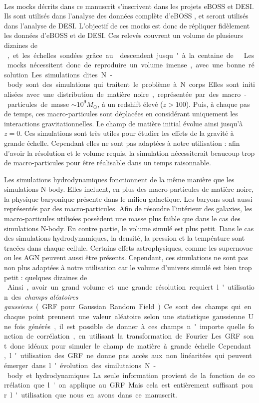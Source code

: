 \documentclass[11pt, twoside, a4paper, openright]{report}
\begin{document}
\paragraph{}
Les mocks décrits dans ce manuscrit s'inscrivent dans les projets eBOSS et DESI. Ils sont utilisés dans l'analyse \lya{} des données complète d'eBOSS \citep{CITE:dr16}, et seront utilisés dans l'analyse \lya{} de DESI.
L'objectif de ces mocks est donc de répliquer fidèlement les données \lya{} d'eBOSS et de DESI. Ces relevés couvrent un volume de plusieurs dizaines de \si{\perh\cubic\Gpc}, et les échelles sondées grâce au \lya{} descendent jusqu'à la centaine de \si{\perh\kpc}. Les mocks nécessitent donc de reproduire un volume imense, avec une bonne résolution.
Les simulations dites N-body sont des simulations qui traitent le problème à N corps. Elles sont initialisées avec une distribution de matière noire, représentée par des macro-particules de masse $\sim 10^{9} M_{\odot}$, à un redshift élevé ($z > 100$). Puis, à chaque pas de temps, ces macro-particules sont déplacées en considérant uniquement les interactions gravitationnelles. Le champ de matière initial évolue ainsi jusqu'à $z=0$. Ces simulations sont très utiles pour étudier les effets de la gravité à grande échelle. Cependant elles ne sont pas adaptées à notre utilisation : afin d'avoir la résolution et le volume requis, la simulation nécessiterait beaucoup trop de macro-particules pour être réalisable dans un temps raisonnable.

Les simulations hydrodynamiques fonctionnent de la même manière que les simulations N-body. Elles incluent, en plus des macro-particules de matière noire, la physique baryonique présente dans le milieu galactique. Les baryons sont aussi représentés par des macro-particules. Afin de résoudre l'intérieur des galaxies, les macro-particules utilisées possèdent une masse plus faible que dans le cas des simulations N-body. En contre partie, le volume simulé est plus petit. Dans le cas des simulations hydrodynamiques, la densité, la pression et la tempéature sont tracées dans chaque cellule. Certains effets astrophysiques, comme les supernovae ou les AGN peuvent aussi être présents. Cependant, ces simulations ne sont pas non plus adaptées à notre utilisation car le volume d'univers simulé est bien trop petit : quelques dizaines de \si{\perh\cubic\Mpc}.
Ainsi, avoir un grand volume et une grande résolution requiert l'utilisation des \emph{champs aléatoires gaussiens} (GRF pour Gaussian Random Field). Ce sont des champs qui en chaque point prennent une valeur aléatoire selon une statistique gaussienne. Une fois générés, il est possible de donner à ces champs n'importe quelle fonction de corrélation, en utilisant la transformation de Fourier. Les GRF sont donc idéaux pour simuler le champ de matière à grande échelle. Cependant, l'utilisation des GRF ne donne pas accès aux non linéaritées qui peuvent émerger dans l'évolution des similutaions N-body et hydrodynamiques. La seule information provient de la fonction de corrélation que l'on applique au GRF. Mais cela est entièrement suffisant pour l'utilisation que nous en avons dans ce manuscrit.
\end{document}
